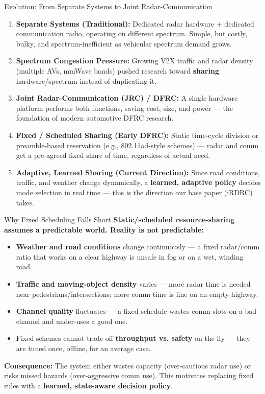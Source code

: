 \documentclass[aspectratio=169]{beamer}
\begin{document}
\begin{frame}{Evolution: From Separate Systems to Joint Radar-Communication}
  \small
  \begin{enumerate}
    \item \textbf{Separate Systems (Traditional):} Dedicated radar hardware + dedicated communication radio, operating on different spectrum. Simple, but costly, bulky, and spectrum-inefficient as vehicular spectrum demand grows.
    \item \textbf{Spectrum Congestion Pressure:} Growing V2X traffic and radar density (multiple AVs, mmWave bands) pushed research toward \textbf{sharing} hardware/spectrum instead of duplicating it.
    \item \textbf{Joint Radar-Communication (JRC) / DFRC:} A single hardware platform performs both functions, saving cost, size, and power --- the foundation of modern automotive DFRC research.
    \item \textbf{Fixed / Scheduled Sharing (Early DFRC):} Static time-cycle division or preamble-based reservation (e.g., 802.11ad-style schemes) --- radar and comm get a pre-agreed fixed share of time, regardless of actual need.
    \item \textbf{Adaptive, Learned Sharing (Current Direction):} Since road conditions, traffic, and weather change dynamically, a \textbf{learned, adaptive policy} decides mode selection in real time --- this is the direction our base paper (iRDRC) takes.
  \end{enumerate}
\end{frame}

\begin{frame}{Why Fixed Scheduling Falls Short}
  \textbf{Static/scheduled resource-sharing assumes a predictable world. Reality is not predictable:}
  \begin{itemize}
    \item \textbf{Weather and road conditions} change continuously --- a fixed radar/comm ratio that works on a clear highway is unsafe in fog or on a wet, winding road.
    \item \textbf{Traffic and moving-object density} varies --- more radar time is needed near pedestrians/intersections; more comm time is fine on an empty highway.
    \item \textbf{Channel quality} fluctuates --- a fixed schedule wastes comm slots on a bad channel and under-uses a good one.
    \item Fixed schemes cannot trade off \textbf{throughput vs. safety} on the fly --- they are tuned once, offline, for an average case.
  \end{itemize}

  \vspace{0.3cm}
  \textbf{Consequence:} The system either wastes capacity (over-cautious radar use) or risks missed hazards (over-aggressive comm use). This motivates replacing fixed rules with a \textbf{learned, state-aware decision policy}.
\end{frame}
\end{document}
